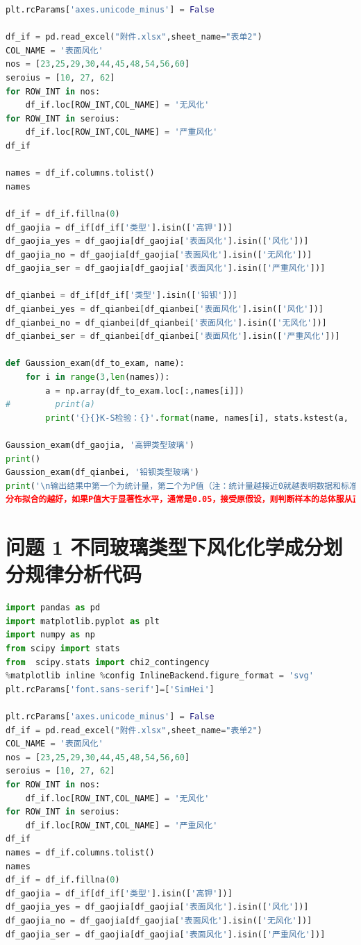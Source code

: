 \documentclass[withoutpreface,bwprint]{cumcmthesis} %
\begin{document}
\begin{appendices}
\begin{lstlisting}[language=Python]
plt.rcParams['axes.unicode_minus'] = False

df_if = pd.read_excel("附件.xlsx",sheet_name="表单2")
COL_NAME = '表面风化'
nos = [23,25,29,30,44,45,48,54,56,60]
seroius = [10, 27, 62]
for ROW_INT in nos:
    df_if.loc[ROW_INT,COL_NAME] = '无风化'
for ROW_INT in seroius:
    df_if.loc[ROW_INT,COL_NAME] = '严重风化'
df_if    

names = df_if.columns.tolist()
names

df_if = df_if.fillna(0)
df_gaojia = df_if[df_if['类型'].isin(['高钾'])]
df_gaojia_yes = df_gaojia[df_gaojia['表面风化'].isin(['风化'])]
df_gaojia_no = df_gaojia[df_gaojia['表面风化'].isin(['无风化'])]
df_gaojia_ser = df_gaojia[df_gaojia['表面风化'].isin(['严重风化'])]

df_qianbei = df_if[df_if['类型'].isin(['铅钡'])]
df_qianbei_yes = df_qianbei[df_qianbei['表面风化'].isin(['风化'])]
df_qianbei_no = df_qianbei[df_qianbei['表面风化'].isin(['无风化'])]
df_qianbei_ser = df_qianbei[df_qianbei['表面风化'].isin(['严重风化'])]

def Gaussion_exam(df_to_exam, name):
    for i in range(3,len(names)):
        a = np.array(df_to_exam.loc[:,names[i]])
#         print(a)
        print('{}{}K-S检验：{}'.format(name, names[i], stats.kstest(a, 'norm')))

Gaussion_exam(df_gaojia, '高钾类型玻璃')
print()
Gaussion_exam(df_qianbei, '铅钡类型玻璃')
print('\n输出结果中第一个为统计量，第二个为P值（注：统计量越接近0就越表明数据和标准正态
分布拟合的越好，如果P值大于显著性水平，通常是0.05，接受原假设，则判断样本的总体服从正态分布）')
\end{lstlisting}

\section{问题 1 不同玻璃类型下风化化学成分划分规律分析代码}
\begin{lstlisting}[language=Python]
import pandas as pd 
import matplotlib.pyplot as plt
import numpy as np
from scipy import stats
from  scipy.stats import chi2_contingency
%matplotlib inline %config InlineBackend.figure_format = 'svg'
plt.rcParams['font.sans-serif']=['SimHei']

plt.rcParams['axes.unicode_minus'] = False
df_if = pd.read_excel("附件.xlsx",sheet_name="表单2")
COL_NAME = '表面风化'
nos = [23,25,29,30,44,45,48,54,56,60]
seroius = [10, 27, 62]
for ROW_INT in nos:
    df_if.loc[ROW_INT,COL_NAME] = '无风化'
for ROW_INT in seroius:
    df_if.loc[ROW_INT,COL_NAME] = '严重风化'
df_if    
names = df_if.columns.tolist()
names
df_if = df_if.fillna(0)
df_gaojia = df_if[df_if['类型'].isin(['高钾'])]
df_gaojia_yes = df_gaojia[df_gaojia['表面风化'].isin(['风化'])]
df_gaojia_no = df_gaojia[df_gaojia['表面风化'].isin(['无风化'])]
df_gaojia_ser = df_gaojia[df_gaojia['表面风化'].isin(['严重风化'])]


\end{lstlisting}
\end{appendices}
\end{document}
